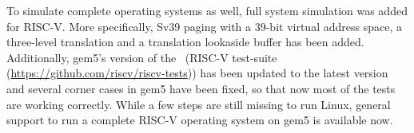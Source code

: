 To simulate complete operating systems as well, full system simulation was added for RISC-V.
More specifically, Sv39 paging with a 39-bit virtual address space, a three-level translation and a translation lookaside buffer has been added.
Additionally, gem5's version of the~\cite{} (RISC-V test-suite (\url{https://github.com/riscv/riscv-tests})) has been updated to the latest version and several corner cases in gem5 have been fixed, so that now most of the tests are working correctly.
While a few steps are still missing to run Linux, general support to run a complete RISC-V operating system on gem5 is available now.

